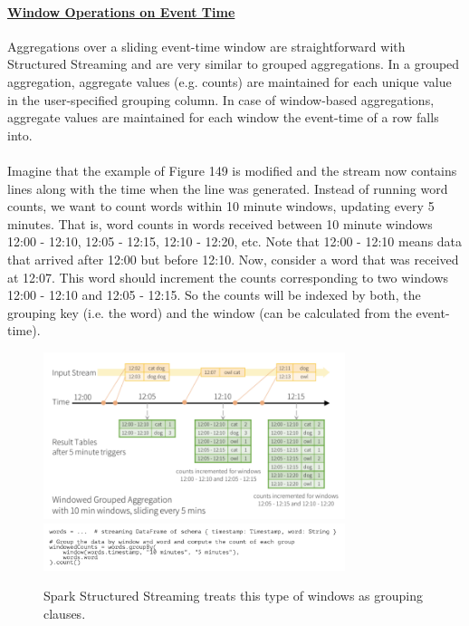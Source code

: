 \documentclass[10pt,a4paper]{article}
\newcommand{\nline}{\\~\\}
\begin{document}
 \paragraph{\uline{Window Operations on Event Time}}
 Aggregations over a sliding event-time window are straightforward with Structured Streaming and are very similar to grouped aggregations. In a grouped aggregation, aggregate values (e.g. counts) are maintained for each unique value in the user-specified grouping column. In case of window-based aggregations, aggregate values are maintained for each window the event-time of a row falls into. 
 \nline
 Imagine that the example of Figure 149 is modified and the stream now contains lines along with the time when the line was generated. Instead of running word counts, we want to count words within 10 minute windows, updating every 5 minutes. That is, word counts in words received between 10 minute windows 12:00 - 12:10, 12:05 - 12:15, 12:10 - 12:20, etc. Note that 12:00 - 12:10 means data that arrived after 12:00 but before 12:10. Now, consider a word that was received at 12:07. This word should increment the counts corresponding to two windows 12:00 - 12:10 and 12:05 - 12:15. So the counts will be indexed by both, the grouping key (i.e. the word) and the window (can be calculated from the event-time).
  \begin{figure}[ht!]
 \hfill \includegraphics[width=250pt]{images/spark-streaming-window}
 \hspace*{\fill}
 \center 
  \hfill \includegraphics[width=250pt]{images/spark-streaming-window-group}
 \hspace*{\fill}
 \caption{Spark Structured Streaming treats this type of windows as grouping clauses.}
 \end{figure}
 \pagebreak
\end{document}
